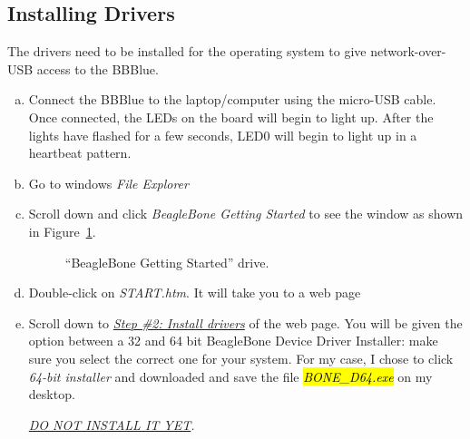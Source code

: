 \subsection{Installing Drivers}
\label{sec:drivers}
The drivers need to be installed for the operating system to give network-over-USB access to the BBBlue.  

\begin{enumerate}[a)]
\item  Connect the BBBlue to the laptop/computer using the micro-USB cable. Once connected, the LEDs on the board will begin to light up. After the lights have flashed for a few seconds, LED0 will begin to light up in a heartbeat pattern. 

\item Go to windows \emph{File Explorer}
  
\item Scroll down and  click \emph{BeagleBone Getting Started} to see the window as shown in Figure~\ref{fig:BBBlue-Start}. %
\begin{figure}
    \centering
    \caption{``BeagleBone Getting Started'' drive.}
    \label{fig:BBBlue-Start}
\end{figure}
%
\item Double-click on \emph{START.htm}.  It will take you to a web page %
\item Scroll down to \emph{\underline{Step \#2: Install drivers}} of the web page.  You will be given the option between a 32 and 64 bit BeagleBone Device Driver Installer: make sure you select the correct one for your system. For my case, I chose to click \emph{64-bit installer} and downloaded  and save the file \hl{\emph{BONE\_D64.exe}} on my desktop. 
  
  \emph{\uppercase{\underline{do not install it yet}}.}

\end{enumerate}

